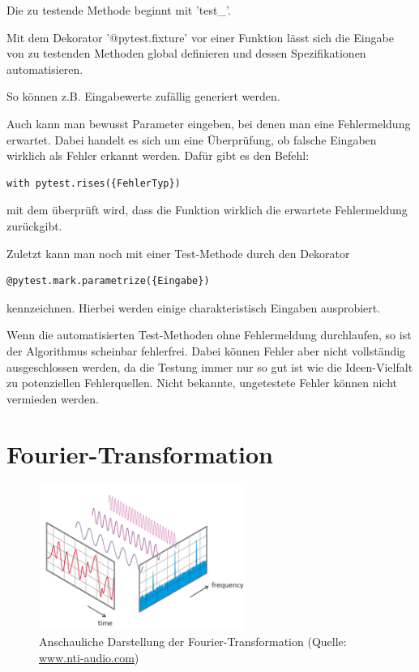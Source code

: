 \documentclass[]{dsadokumentation}
\begin{document}
Die zu testende Methode beginnt mit 'test\_'.

Mit dem Dekorator '@pytest.fixture' vor einer Funktion lässt sich die Eingabe von zu testenden Methoden global definieren und dessen Spezifikationen automatisieren.

So können z.B. Eingabewerte zufällig generiert werden.

Auch kann man bewusst Parameter eingeben, bei denen man eine Fehlermeldung erwartet. Dabei handelt es sich um eine Überprüfung, ob falsche Eingaben wirklich als Fehler erkannt werden. Dafür gibt es den Befehl:
\begin{verbatim}
with pytest.rises({FehlerTyp})
\end{verbatim}
mit dem überprüft wird, dass die Funktion wirklich die erwartete Fehlermeldung zurückgibt.

Zuletzt kann man noch mit einer Test-Methode durch den Dekorator
\begin{verbatim}
@pytest.mark.parametrize({Eingabe})
\end{verbatim}
kennzeichnen. Hierbei werden einige charakteristisch Eingaben ausprobiert.

Wenn die automatisierten Test-Methoden ohne Fehlermeldung durchlaufen, so ist der Algorithmus scheinbar fehlerfrei. Dabei können Fehler aber nicht vollständig ausgeschlossen werden, da die Testung immer nur so gut ist wie die Ideen-Vielfalt zu potenziellen Fehlerquellen. Nicht bekannte, ungetestete Fehler können nicht vermieden werden.

\section{Fourier-Transformation}


\begin{figure}[h!]
  \centering
  \includegraphics[width=0.6\textwidth]{k4.2/fourier.png}
  \caption{Anschauliche Darstellung der Fourier-Transformation (Quelle: \url{www.nti-audio.com})}
\end{figure}
\end{document}
